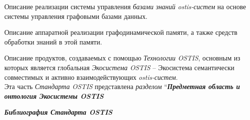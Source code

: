 \begin{SCn}
{\begin{scnitemize}
\begin{scnitemizeii}
				\item Описание реализации системы управления \textit{базами знаний
					ostis-систем} на основе системы управления графовыми базами данных.
				\item Описание аппаратной реализации графодинамической памяти, а также
				средств обработки знаний в этой памяти.
			\end{scnitemizeii}
			\item Описание продуктов, создаваемых с помощью \textit{Технологии
				OSTIS}, основным из которых является глобальная \textit{Экосистема OSTIS} --
			Экосистема семантически совместимых и активно взаимодействующих
			\textit{ostis-систем}.\\Эта часть \textit{Стандарта OSTIS} представлена
			\textit{разделом} ``\textit{\textbf{Предметная область и онтология Экосистемы
					OSTIS}}
			\item \textit{\textbf{Библиография Стандарта OSTIS}}
		\end{scnitemize}
	}
\end{SCn}